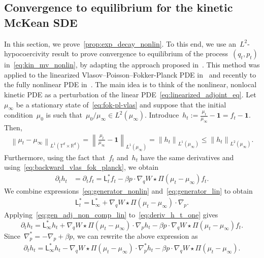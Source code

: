 \documentclass[onefignum,onetabnum]{siamart251216} %
\newcommand{\norm}[1]{\left\lVert#1\right\rVert}
\newcommand{\torus}{\mathbb T}
\newcommand{\real}{\mathbb R}
\renewcommand{\leq}{\leqslant}
\newcommand{\mescin}{\mu}
\newcommand{\projp}{\Pi}
\newcommand{\adj}{\mathsf{L}_\infty^*}
\newcommand{\gennonlin}[1]{\mathsf{L}_{#1}}
\theoremstyle{plain}
\numberwithin{equation}{section}
\numberwithin{theorem}{section}
\begin{document}
\subsection{Convergence to equilibrium for the kinetic McKean SDE}
\label{sec:cvg_eq}
In this section, we prove~\cref{prop:exp_decay_nonlin}. To this end, we use an~$L^2$-hypocoercivity result to prove convergence to equilibrium of the process~$(q_t,p_t)$ in~\eqref{eq:kin_mv_nonlin}, by adapting the approach proposed in~\cite{dolbeault2009hypocoercivity,dolbeault2015hypocoercivity}.
This method was applied to the linearized Vlasov--Poisson--Fokker-Planck PDE in~\cite{addala20212} and recently to the fully nonlinear PDE in~\cite{gervais2024well}.
The main idea is to think of the nonlinear, nonlocal kinetic PDE as a perturbation of the linear PDE~\eqref{eq:linearized_adjoint_eq}. Let~$\mescin_\infty$ be a stationary state of~\eqref{eq:fok-pl-vlas} and suppose that the initial condition~$\mescin_0$ is such that~$\mescin_0/\mescin_\infty \in L^2(\mescin_\infty)$. Introduce~$h_t := \displaystyle\frac{\mescin_t}{\mescin_\infty} - \textbf{1} = f_t - \textbf{1}$.
Then,
\begin{align}
    \label{eq:conv_eq_L1}
    \norm{\mescin_t - \mescin_\infty}_{L^1(\torus^d \times \real^d)} = \norm{\frac{\mescin_t}{\mescin_\infty} - \textbf{1}}_{L^1(\mescin_\infty)} = \norm{h_t}_{L^1(\mescin_\infty)} \leq \norm{h_t}_{L^2(\mescin_\infty)}.
\end{align}
Furthermore, using the fact that~$f_t$ and~$h_t$ have the same derivatives and using~\eqref{eq:backward_vlas_fok_planck}, we obtain
\begin{align}
    \label{eq:deriv_h_t_one}
    \partial_t h_t &= \partial_t f_t = \gennonlin{t}^*f_t - \beta p\cdot\nabla_q W \star \projp (\mescin_t - \mescin_\infty)f_t.
\end{align}
We combine expressions~\eqref{eq:generator_nonlin} and~\eqref{eq:generator_lin} to obtain
\begin{align}
    \label{eq:gen_adj_non_comp_lin}
    \gennonlin{t}^* = \adj + \nabla_q W \star  \projp(\mescin_t -\mescin_\infty)\cdot \nabla_p.
\end{align}
Applying~\eqref{eq:gen_adj_non_comp_lin} to~\eqref{eq:deriv_h_t_one} gives
\[
\partial_t h_t = \adj h_t + \nabla_q W \star  \projp(\mescin_t -\mescin_\infty)\cdot \nabla_p h_t - \beta p\cdot\nabla_q W \star \projp (\mescin_t - \mescin_\infty)f_t.
\]
Since~$\nabla_p^* = -\nabla_p + \beta p$, we can rewrite the above expression as
\begin{align}
    \label{eq:deriv_h_t_two}
    \partial_t h_t = \adj h_t - \nabla_q W \star  \projp(\mescin_t -\mescin_\infty)\cdot \nabla_p^* h_t - \beta p\cdot\nabla_q W \star \projp (\mescin_t - \mescin_\infty).
\end{align}
\end{document}
